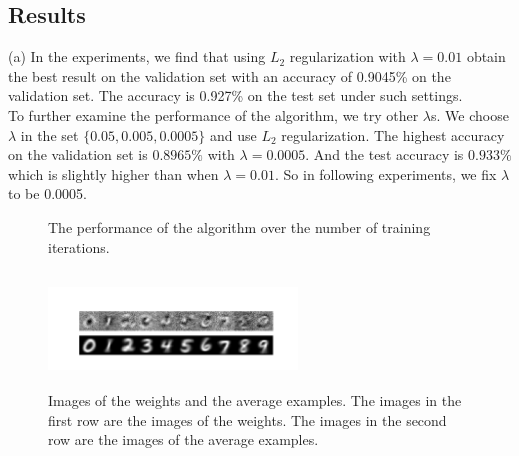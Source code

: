 \documentclass{article} %
\begin{document}
\subsection{Results}
(a) In the experiments, we find that using $L_2$ regularization with $\lambda = 0.01$ obtain the best result on the validation set with an accuracy of 0.9045\% on the validation set. The accuracy is 0.927\% on the test set under such settings. \\

To further examine the performance of the algorithm, we try other $\lambda$s. We choose $\lambda$ in the set $\{0.05,0.005,0.0005\}$ and use $L_2$ regularization. The highest accuracy on the validation set is $0.8965\%$ with $\lambda = 0.0005$. And the test accuracy is $0.933\%$ which is slightly higher than when $\lambda = 0.01$. So in following experiments, we fix $\lambda$ to be 0.0005.

\begin{figure}[t]%
	\centering
	\qquad
	\caption{The performance of the algorithm over the number of training iterations. }%
\end{figure}

\begin{figure}[t]
	\centering	
	\includegraphics[width=2.6in,height=1.2in]{../softmax/figs/image_of_weights_and_digits.png} 
	\caption{Images of the weights and the average examples. The images in the first row are the images of the weights. The images in the second row are the images of the average examples.}
	\label{fig: 13}
\end{figure}
\end{document}
